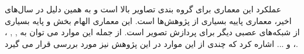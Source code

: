عملکرد این معماری برای گروه بندی تصاویر بالا است و به همین دلیل در سال‌های اخیر، معماری پاییه بسیاری از پژوهش‌ها است.
این معماری الهام بخش و پایه بسیاری از شبکه‌های عصبی دیگر برای پردازش تصویر است. از جمله این موارد می توان به , , ، ،  و ... اشاره کرد که چندی از این موارد در این پژوهش نیز مورد بررسی قرار می گیرد.
